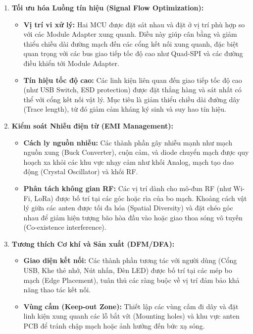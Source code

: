 \begin{enumerate}
                \item \textbf{Tối ưu hóa Luồng tín hiệu (Signal Flow Optimization):}
                \begin{itemize}
                    \item \textbf{Vị trí vi xử lý:} Hai MCU được đặt sát nhau và đặt ở vị trí phù hợp so với các Module Adapter xung quanh. Điều này giúp cân bằng và giảm thiểu chiều dài đường mạch đến các cổng kết nối xung quanh, đặc biệt quan trọng với các bus giao tiếp tốc độ cao như Quad-SPI và các đường điều khiển tới Module Adapter.
                    \item \textbf{Tín hiệu tốc độ cao:} Các linh kiện liên quan đến giao tiếp tốc độ cao (như USB Switch, ESD protection) được đặt thẳng hàng và sát nhất có thể với cổng kết nối vật lý. Mục tiêu là giảm thiểu chiều dài đường dây (Trace length), từ đó giảm cảm kháng ký sinh và suy hao tín hiệu.
                \end{itemize}

                \item \textbf{Kiểm soát Nhiễu điện từ (EMI Management):}
                \begin{itemize}
                    \item \textbf{Cách ly nguồn nhiễu:} Các thành phần gây nhiễu mạnh như mạch nguồn xung (Buck Converter), cuộn cảm, và diode chuyển mạch được quy hoạch xa khỏi các khu vực nhạy cảm như khối Analog, mạch tạo dao động (Crystal Oscillator) và khối RF.
                    \item \textbf{Phân tách không gian RF:} Các vị trí dành cho mô-đun RF (như Wi-Fi, LoRa) được bố trí tại các góc hoặc rìa của bo mạch. Khoảng cách vật lý giữa các anten được tối đa hóa (Spatial Diversity) và đặt chéo góc nhau để giảm hiện tượng bão hòa đầu vào hoặc giao thoa sóng vô tuyến (Co-existence interference).
                \end{itemize}

                \item \textbf{Tương thích Cơ khí và Sản xuất (DFM/DFA):}
                \begin{itemize}
                    \item \textbf{Giao diện kết nối:} Các thành phần tương tác với người dùng (Cổng USB, Khe thẻ nhớ, Nút nhấn, Đèn LED) được bố trí tại các mép bo mạch (Edge Placement), tuân thủ các ràng buộc về vị trí đảm bảo khả năng thao tác kết nối.
                    \item \textbf{Vùng cấm (Keep-out Zone):} Thiết lập các vùng cấm đi dây và đặt linh kiện xung quanh các lỗ bắt vít (Mounting holes) và khu vực anten PCB để tránh chập mạch hoặc ảnh hưởng đến bức xạ sóng.
                \end{itemize}
            \end{enumerate}

